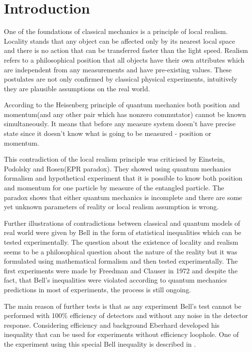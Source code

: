 \documentclass[11pt]{article}
\begin{document}
\section{Introduction}
One of the foundations of classical mechanics is a principle of local realism. Locality stands that any object can be affected only by its nearest local space and there is no action that can be transferred faster than the light speed. Realism refers to a philosophical position that all objects have their own attributes which are independent from any measurements and have pre-existing values. These postulates are not only confirmed by classical physical experiments, intuitively they are plausible assumptions on the real world.

According to the Heisenberg principle of quantum mechanics both position and momentum(and any other pair which has nonzero commutator) cannot be known simultaneously. It means that before any measure system doesn't have precise state since it doesn't know what is going to be measured - position or momentum.

This contradiction of the local realism principle was criticised by Einstein, Podolsky and Rosen(EPR paradox). They showed using quantum mechanics formalism and hypothetical experiment that it is possible to know both position and momentum for one particle by measure of the entangled particle. The paradox shows that either quantum mechanics is incomplete and there are some yet unknown parameters of reality or local realism assumption is wrong. 

Further illustrations of contradictions between classical and quantum models of real world were given by Bell in the form of statistical inequalities which can be tested experimentally. The question about the existence of locality and realism seems to be a philosophical question about the nature of the reality but it was formulated using mathematical formalism and then tested experimentally. The first experiments were made by Freedman and Clauser in 1972 and despite the fact, that Bell's inequalities were violated according to quantum mechanics predictions in most of experiments, the process is still ongoing.

The main reason of further tests is that as any experiment Bell's test cannot be performed with 100\% efficiency of detectors and without any noise in the detector response. Considering efficiency and background Eberhard developed his inequality \cite{Eberhard} that can be used for experiments without efficiency loophole. One of the experiment using this special Bell inequality is described in \cite{Zeilinger}.
\end{document}
